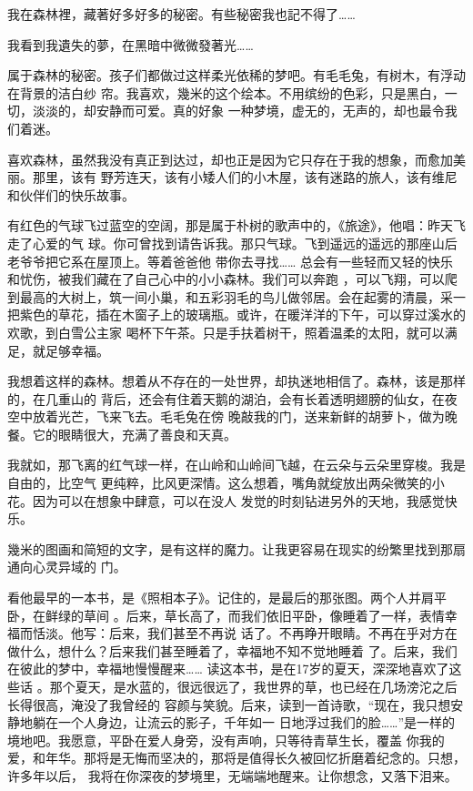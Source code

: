 \documentclass[12pt,a4paper]{article}
\begin{document}
	\endwriting



		我在森林裡，藏著好多好多的秘密。有些秘密我也記不得了……

		我看到我遺失的夢，在黑暗中微微發著光……


		属于森林的秘密。孩子们都做过这样柔光依稀的梦吧。有毛毛兔，有树木，有浮动在背景的洁白纱
	帘。我喜欢，幾米的这个绘本。不用缤纷的色彩，只是黑白，一切，淡淡的，却安静而可爱。真的好象
	一种梦境，虚无的，无声的，却也最令我们着迷。

		喜欢森林，虽然我没有真正到达过，却也正是因为它只存在于我的想象，而愈加美丽。那里，该有
	野芳连天，该有小矮人们的小木屋，该有迷路的旅人，该有维尼和伙伴们的快乐故事。

		有红色的气球飞过蓝空的空阔，那是属于朴树的歌声中的，《旅途》，他唱：昨天飞走了心爱的气
	球。你可曾找到请告诉我。那只气球。飞到遥远的遥远的那座山后老爷爷把它系在屋顶上。等着爸爸他
	带你去寻找…… 总会有一些轻而又轻的快乐和忧伤，被我们藏在了自己心中的小小森林。我们可以奔跑
	，可以飞翔，可以爬到最高的大树上，筑一间小巢，和五彩羽毛的鸟儿做邻居。会在起雾的清晨，采一
	把紫色的草花，插在木窗子上的玻璃瓶。或许，在暖洋洋的下午，可以穿过溪水的欢歌，到白雪公主家
	喝杯下午茶。只是手扶着树干，照着温柔的太阳，就可以满足，就足够幸福。

		我想着这样的森林。想着从不存在的一处世界，却执迷地相信了。森林，该是那样的，在几重山的
	背后，还会有住着天鹅的湖泊，会有长着透明翅膀的仙女，在夜空中放着光芒，飞来飞去。毛毛兔在傍
	晚敲我的门，送来新鲜的胡萝卜，做为晚餐。它的眼睛很大，充满了善良和天真。

		我就如，那飞离的红气球一样，在山岭和山岭间飞越，在云朵与云朵里穿梭。我是自由的，比空气
	更纯粹，比风更深情。这么想着，嘴角就绽放出两朵微笑的小花。因为可以在想象中肆意，可以在没人
	发觉的时刻钻进另外的天地，我感觉快乐。

		幾米的图画和简短的文字，是有这样的魔力。让我更容易在现实的纷繁里找到那扇通向心灵异域的
	门。

		看他最早的一本书，是《照相本子》。记住的，是最后的那张图。两个人并肩平卧，在鲜绿的草间
	。后来，草长高了，而我们依旧平卧，像睡着了一样，表情幸福而恬淡。他写：后来，我们甚至不再说
	话了。不再睁开眼睛。不再在乎对方在做什么，想什么？后来我们甚至睡着了，幸福地不知不觉地睡着
	了。后来，我们在彼此的梦中，幸福地慢慢醒来…… 读这本书，是在17岁的夏天，深深地喜欢了这些话
	。那个夏天，是水蓝的，很远很远了，我世界的草，也已经在几场滂沱之后长得很高，淹没了我曾经的
	容颜与笑貌。后来，读到一首诗歌，“现在，我只想安静地躺在一个人身边，让流云的影子，千年如一
	日地浮过我们的脸……”是一样的境地吧。我愿意，平卧在爱人身旁，没有声响，只等待青草生长，覆盖
	你我的爱，和年华。那将是无悔而坚决的，那将是值得长久被回忆折磨着纪念的。只想，许多年以后，
	我将在你深夜的梦境里，无端端地醒来。让你想念，又落下泪来。
\end{document}
